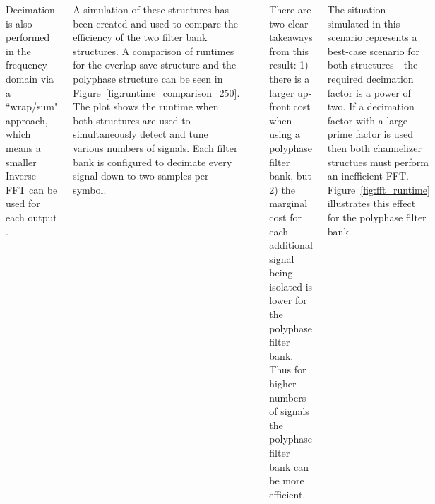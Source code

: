 \documentclass[24pt, a0papper, portrait]{tikzposter}
\begin{document}
\begin{columns}
{\begin{tikzfigure}
        \end{tikzfigure}
        Decimation is also performed in the frequency domain via a ``wrap/sum" 
        approach, which means a smaller Inverse FFT can be used for each output \cite{Borgerding1}.
    }
    {
A simulation of these structures has been created and used to compare the
efficiency of the two filter bank structures. A comparison of runtimes for the
overlap-save structure and the polyphase structure can be seen in
Figure~\ref{fig:runtime_comparison_250}. The plot shows the runtime when both
structures are used to simultaneously detect and tune various numbers of
signals. Each filter bank is configured to decimate every signal down to two
samples per symbol.

        \begin{tikzfigure}
            \includegraphics[width=0.8\linewidth]{runtime_comparison_250}
            \label{fig:runtime_comparison_250}
        \end{tikzfigure}

    
There are two clear takeaways from this result: 1) there is a larger up-front cost when using a polyphase filter bank, but 2) the
marginal cost for each additional signal being isolated is lower for the
polyphase filter bank. Thus for higher numbers of signals the polyphase filter bank can be more efficient.

\vspace{1cm}

The situation simulated in this scenario represents a best-case scenario for
both structures - the required decimation factor is a power of two. If a decimation
factor with a large prime factor is used then both channelizer structues must perform an inefficient FFT. Figure~\ref{fig:fft_runtime} illustrates this effect
for the polyphase filter bank.

}
\end{columns}
\end{document}
